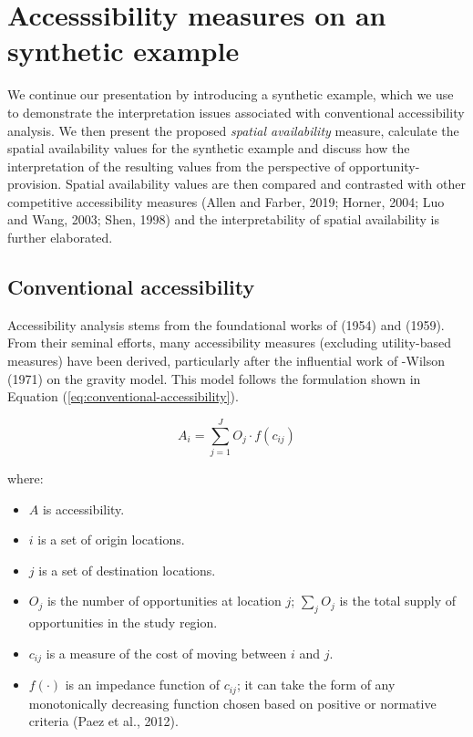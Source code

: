 \documentclass[]{elsarticle} %
\providecommand{\tightlist}{%
  \setlength{\itemsep}{0pt}\setlength{\parskip}{0pt}}
\begin{document}
\hypertarget{background}{%
\section{Accesssibility measures on an synthetic
example}\label{background}}

We continue our presentation by introducing a synthetic example, which
we use to demonstrate the interpretation issues associated with
conventional accessibility analysis. We then present the proposed
\emph{spatial availability} measure, calculate the spatial availability
values for the synthetic example and discuss how the interpretation of
the resulting values from the perspective of opportunity-provision.
Spatial availability values are then compared and contrasted with other
competitive accessibility measures (Allen and Farber, 2019; Horner,
2004; Luo and Wang, 2003; Shen, 1998) and the interpretability of
spatial availability is further elaborated.

\hypertarget{conventional-accessibility}{%
\subsection{Conventional
accessibility}\label{conventional-accessibility}}

Accessibility analysis stems from the foundational works of (1954) and
(1959). From their seminal efforts, many accessibility measures
(excluding utility-based measures) have been derived, particularly after
the influential work of -Wilson (1971) on the gravity model. This model
follows the formulation shown in Equation
(\ref{eq:conventional-accessibility}).

\begin{equation}
\label{eq:conventional-accessibility}
A_i = \sum_{j=1}^JO_j \cdot f(c_{ij})
\end{equation}

\noindent where:

\begin{itemize}
\tightlist
\item
  \(A\) is accessibility.
\item
  \(i\) is a set of origin locations.
\item
  \(j\) is a set of destination locations.
\item
  \(O_j\) is the number of opportunities at location \(j\);
  \(\sum_j O_j\) is the total supply of opportunities in the study
  region.
\item
  \(c_{ij}\) is a measure of the cost of moving between \(i\) and \(j\).
\item
  \(f(\cdot)\) is an impedance function of \(c_{ij}\); it can take the
  form of any monotonically decreasing function chosen based on positive
  or normative criteria (Paez et al., 2012).
\end{itemize}
\end{document}
